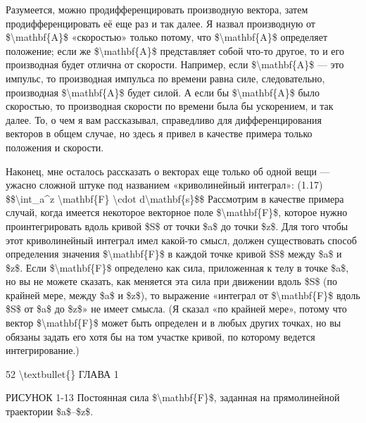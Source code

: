 \documentclass[10pt,oneside]{article}
\newcommand{\TipsSubsection}[1]{\par\vspace{6bp}{\normalsize\bfseries #1\par}\vspace{2bp}}
\begin{document}
Разумеется, можно продифференцировать производную вектора, затем продифференцировать её еще раз и так далее. Я назвал производную от \$\textbackslash{}mathbf\{A\}\$ «скоростью» только потому, что \$\textbackslash{}mathbf\{A\}\$ определяет положение; если же \$\textbackslash{}mathbf\{A\}\$ представляет собой что-то другое, то и его производная будет отлична от скорости. Например, если \$\textbackslash{}mathbf\{A\}\$ --- это импульс, то производная импульса по времени равна силе, следовательно, производная \$\textbackslash{}mathbf\{A\}\$ будет силой. А если бы \$\textbackslash{}mathbf\{A\}\$ было скоростью, то производная скорости по времени была бы ускорением, и так далее. То, о чем я вам рассказывал, справедливо для дифференцирования векторов в общем случае, но здесь я привел в качестве примера только положения и скорости.\par

\TipsSubsection{1-8 Криволинейные интегралы}

Наконец, мне осталось рассказать о векторах еще только об одной вещи --- ужасно сложной штуке под названием «криволинейный интеграл»: (1.17) \$\$\textbackslash{}int\_a\textasciicircum{}z \textbackslash{}mathbf\{F\} \textbackslash{}cdot d\textbackslash{}mathbf\{s\}\$\$ Рассмотрим в качестве примера случай, когда имеется некоторое векторное поле \$\textbackslash{}mathbf\{F\}\$, которое нужно проинтегрировать вдоль кривой \$S\$ от точки \$a\$ до точки \$z\$. Для того чтобы этот криволинейный интеграл имел какой-то смысл, должен существовать способ определения значения \$\textbackslash{}mathbf\{F\}\$ в каждой точке кривой \$S\$ между \$a\$ и \$z\$. Если \$\textbackslash{}mathbf\{F\}\$ определено как сила, приложенная к телу в точке \$a\$, но вы не можете сказать, как меняется эта сила при движении вдоль \$S\$ (по крайней мере, между \$a\$ и \$z\$), то выражение «интеграл от \$\textbackslash{}mathbf\{F\}\$ вдоль \$S\$ от \$a\$ до \$z\$» не имеет смысла. (Я сказал «по крайней мере», потому что вектор \$\textbackslash{}mathbf\{F\}\$ может быть определен и в любых других точках, но вы обязаны задать его хотя бы на том участке кривой, по которому ведется интегрирование.)\par

52 \textbackslash{}textbullet\{\} ГЛАВА 1\par

РИСУНОК 1-13 Постоянная сила \$\textbackslash{}mathbf\{F\}\$, заданная на прямолинейной траектории \$a\$–\$z\$.\par
\end{document}

